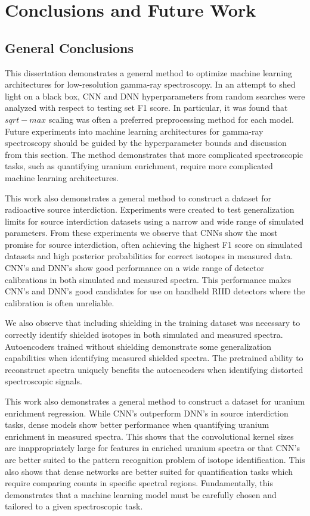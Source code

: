 \chapter{Conclusions and Future Work}

\section{General Conclusions}

This dissertation demonstrates a general method to optimize machine learning architectures for low-resolution gamma-ray spectroscopy. In an attempt to shed light on a black box, CNN and DNN hyperparameters from random searches were analyzed with respect to testing set F1 score. In particular, it was found that $sqrt-max$ scaling was often a preferred preprocessing method for each model. Future experiments into machine learning architectures for gamma-ray spectroscopy should be guided by the hyperparameter bounds and discussion from this section. The method demonstrates that more complicated spectroscopic tasks, such as quantifying uranium enrichment, require more complicated machine learning architectures.

This work also demonstrates a general method to construct a dataset for radioactive source interdiction. Experiments were created to test generalization limits for source interdiction datasets using a narrow and wide range of simulated parameters. From these experiments we observe that CNNs show the most promise for source interdiction, often achieving the highest F1 score on simulated datasets and high posterior probabilities for correct isotopes in measured data. CNN's and DNN's show good performance on a wide range of detector calibrations in both simulated and measured spectra. This performance makes CNN's and DNN's good candidates for use on handheld RIID detectors where the calibration is often unreliable.

We also observe that including shielding in the training dataset was necessary to correctly identify shielded isotopes in both simulated and measured spectra. Autoencoders trained without shielding demonstrate some generalization capabilities when identifying measured shielded spectra. The pretrained ability to reconstruct spectra uniquely benefits the autoencoders when identifying distorted spectroscopic signals. 

This work also demonstrates a general method to construct a dataset for uranium enrichment regression. While CNN's outperform DNN's in source interdiction tasks, dense models show better performance when quantifying uranium enrichment in measured spectra. This shows that the convolutional kernel sizes are inappropriately large for features in enriched uranium spectra or that CNN's are better suited to the pattern recognition problem of isotope identification. This also shows that dense networks are better suited for quantification tasks which require comparing counts in specific spectral regions. Fundamentally, this demonstrates that a machine learning model must be carefully chosen and tailored to a given spectroscopic task.


